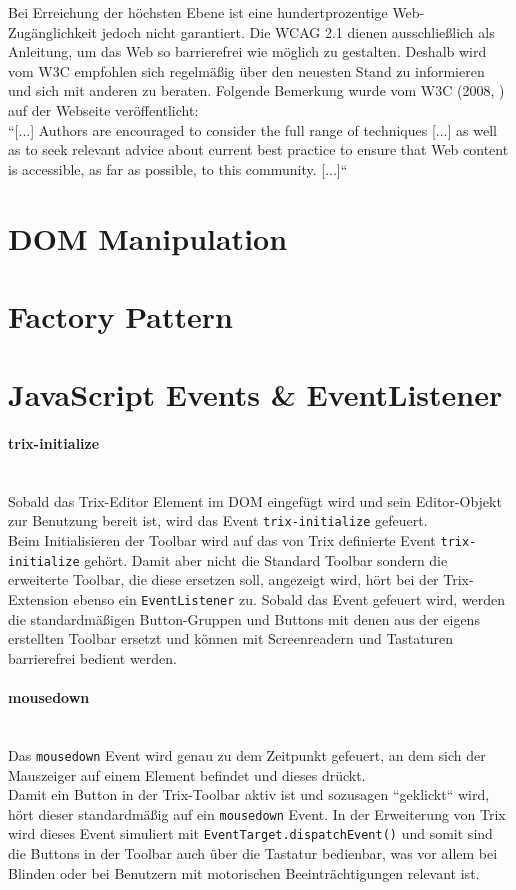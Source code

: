 Bei Erreichung der höchsten Ebene ist eine hundertprozentige Web-Zugänglichkeit jedoch nicht garantiert. Die WCAG 2.1 dienen ausschließlich als Anleitung, um das Web so barrierefrei wie möglich zu gestalten. Deshalb wird vom W3C empfohlen sich regelmäßig über den neuesten Stand zu informieren und sich mit anderen zu beraten. Folgende Bemerkung wurde vom W3C (2008, \cite{wcag_2_1_2018}) auf der Webseite veröffentlicht:\\
``[...] Authors are encouraged to consider the full range of techniques [...] as well as to seek relevant advice about current best practice to ensure that Web content is accessible, as far as possible, to this community. [...]``

\section{DOM Manipulation}

\section{Factory Pattern}

\section{JavaScript Events \& EventListener}
\paragraph{trix-initialize}\mbox{}\\
Sobald das Trix-Editor Element im DOM eingefügt wird und sein Editor-Objekt zur Benutzung bereit ist, wird das Event \texttt{trix-initialize} gefeuert.\\
Beim Initialisieren der Toolbar wird auf das von Trix definierte Event \texttt{trix-initialize} gehört. Damit aber nicht die Standard Toolbar sondern die erweiterte Toolbar, die diese ersetzen soll, angezeigt wird, hört bei der Trix-Extension ebenso ein \texttt{EventListener} zu. Sobald das Event gefeuert wird, werden die standardmäßigen Button-Gruppen und Buttons mit denen aus der eigens erstellten Toolbar ersetzt und können mit Screenreadern und Tastaturen barrierefrei bedient werden.

\paragraph{mousedown}\mbox{}\\
Das \texttt{mousedown} Event wird genau zu dem Zeitpunkt gefeuert, an dem sich der Mauszeiger auf einem Element befindet und dieses drückt.\\
Damit ein Button in der Trix-Toolbar aktiv ist und sozusagen ``geklickt`` wird, hört dieser standardmäßig auf ein \texttt{mousedown} Event. In der Erweiterung von Trix wird dieses Event simuliert mit \texttt{EventTarget.dispatchEvent()} und somit sind die Buttons in der Toolbar auch über die Tastatur bedienbar, was vor allem bei Blinden oder bei Benutzern mit motorischen Beeinträchtigungen relevant ist.

